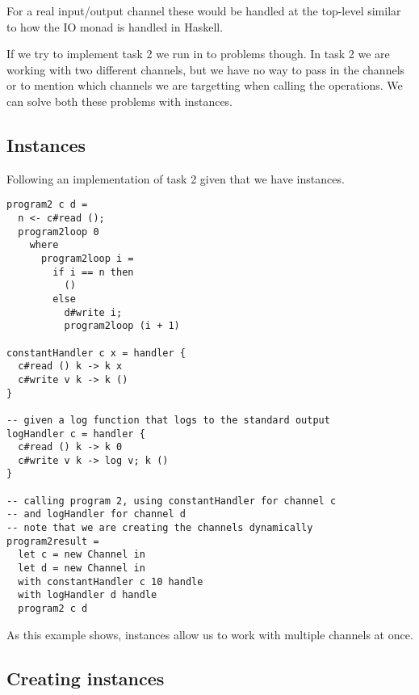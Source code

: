 \documentclass[12pt]{article}
\begin{document}
For a real input/output channel these would be handled at the top-level similar to how the IO monad is handled in Haskell.

If we try to implement task 2 we run in to problems though.
In task 2 we are working with two different channels, but we have no way to pass in the channels or to mention which channels we are targetting when calling the operations.
We can solve both these problems with instances.

\subsection{Instances}

Following an implementation of task 2 given that we have instances.

\begin{verbatim}
program2 c d =
  n <- c#read ();
  program2loop 0
    where
      program2loop i =
        if i == n then
          ()
        else
          d#write i;
          program2loop (i + 1)
          
constantHandler c x = handler {
  c#read () k -> k x
  c#write v k -> k ()
}

-- given a log function that logs to the standard output
logHandler c = handler {
  c#read () k -> k 0
  c#write v k -> log v; k ()
}

-- calling program 2, using constantHandler for channel c
-- and logHandler for channel d
-- note that we are creating the channels dynamically
program2result =
  let c = new Channel in
  let d = new Channel in
  with constantHandler c 10 handle
  with logHandler d handle
  program2 c d
\end{verbatim}

As this example shows, instances allow us to work with multiple channels at once.

\subsection{Creating instances}
\end{document}
